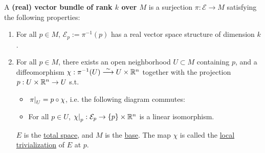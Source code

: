 \documentclass{article}
\begin{document}
\begin{definition}
    A \textbf{(real) vector bundle of rank $k$ over $M$} is a surjection $\pi: \mathcal{E} \to M$ satisfying the following properties:
    \begin{enumerate}
        \item For all $p \in M$, $\mathcal{E}_p := \pi^{-1}(p)$ has a real vector space structure of dimension $k$.
        \item For all $p \in M$, there exists an open neighborhood $U \subset M$ containing $p$, and a diffeomorphism $\chi: \pi^{-1}(U) \overset{\sim}{\longrightarrow} U \times \mathbb{R}^n$ together with the projection $p: U \times \mathbb{R}^n \to U$ s.t.
        \begin{itemize}
            \item $\left.\pi\right|_{U} = p \circ \chi$, i.e. the following diagram commutes:
            
            \begin{minipage}{\linewidth}
                \centering
            \end{minipage}
            \item For all $p \in U$, $\left.\chi\right|_{p}: \mathcal{E}_p \to \{p\} \times \mathbb{R}^n$ is a linear isomorphism.
        \end{itemize}
        $E$ is the \underline{total space}, and $M$ is the \underline{base}. The map $\chi$ is called the \underline{local trivialization} of $E$ at $p$.
    \end{enumerate}
\end{definition}
\end{document}
